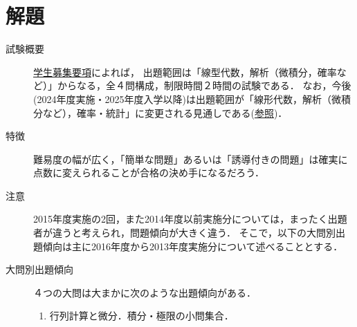 \documentclass[uplatex,dvipdfmx]{jsarticle}
\begin{document}
\section{解題}

\begin{description}
    \item[試験概要] \href{https://www.soken.ac.jp/admission/general_admission/gias_guideline/index.html}{学生募集要項}によれば，
    出題範囲は「線型代数，解析（微積分，確率など）」からなる，全４問構成，制限時間２時間の試験である．
    なお，今後(2024年度実施・2025年度入学以降)は出題範囲が「線形代数，解析（微積分など），確率・統計」に変更される見通しである(\href{https://www.soken.ac.jp/cms_upload/henko_ism20220908.pdf}{参照})．
    \item[特徴] 難易度の幅が広く，「簡単な問題」あるいは「誘導付きの問題」は確実に点数に変えられることが合格の決め手になるだろう．
    \item[注意] 2015年度実施の2回，また2014年度以前実施分については，まったく出題者が違うと考えられ，問題傾向が大きく違う．
    そこで，以下の大問別出題傾向は主に2016年度から2013年度実施分について述べることとする．
    \item[大問別出題傾向] ４つの大問は大まかに次のような出題傾向がある．
    \begin{enumerate}[{第}1{問}]
        \item 行列計算と微分．積分・極限の小問集合．
        

\end{enumerate}
\end{description}
\end{document}
